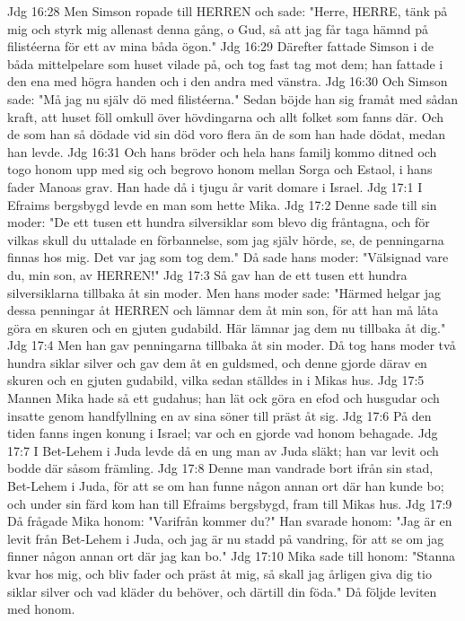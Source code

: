 Jdg 16:28  Men Simson ropade till HERREN och sade: "Herre, HERRE, tänk på mig och styrk mig allenast denna gång, o Gud, så att jag får taga hämnd på filistéerna för ett av mina båda ögon."
Jdg 16:29  Därefter fattade Simson i de båda mittelpelare som huset vilade på, och tog fast tag mot dem; han fattade i den ena med högra handen och i den andra med vänstra.
Jdg 16:30  Och Simson sade: "Må jag nu själv dö med filistéerna." Sedan böjde han sig framåt med sådan kraft, att huset föll omkull över hövdingarna och allt folket som fanns där. Och de som han så dödade vid sin död voro flera än de som han hade dödat, medan han levde.
Jdg 16:31  Och hans bröder och hela hans familj kommo ditned och togo honom upp med sig och begrovo honom mellan Sorga och Estaol, i hans fader Manoas grav. Han hade då i tjugu år varit domare i Israel.
Jdg 17:1  I Efraims bergsbygd levde en man som hette Mika.
Jdg 17:2  Denne sade till sin moder: "De ett tusen ett hundra silversiklar som blevo dig fråntagna, och för vilkas skull du uttalade en förbannelse, som jag själv hörde, se, de penningarna finnas hos mig. Det var jag som tog dem." Då sade hans moder: "Välsignad vare du, min son, av HERREN!"
Jdg 17:3  Så gav han de ett tusen ett hundra silversiklarna tillbaka åt sin moder. Men hans moder sade: "Härmed helgar jag dessa penningar åt HERREN och lämnar dem åt min son, för att han må låta göra en skuren och en gjuten gudabild. Här lämnar jag dem nu tillbaka åt dig."
Jdg 17:4  Men han gav penningarna tillbaka åt sin moder. Då tog hans moder två hundra siklar silver och gav dem åt en guldsmed, och denne gjorde därav en skuren och en gjuten gudabild, vilka sedan ställdes in i Mikas hus.
Jdg 17:5  Mannen Mika hade så ett gudahus; han lät ock göra en efod och husgudar och insatte genom handfyllning en av sina söner till präst åt sig.
Jdg 17:6  På den tiden fanns ingen konung i Israel; var och en gjorde vad honom behagade.
Jdg 17:7  I Bet-Lehem i Juda levde då en ung man av Juda släkt; han var levit och bodde där såsom främling.
Jdg 17:8  Denne man vandrade bort ifrån sin stad, Bet-Lehem i Juda, för att se om han funne någon annan ort där han kunde bo; och under sin färd kom han till Efraims bergsbygd, fram till Mikas hus.
Jdg 17:9  Då frågade Mika honom: "Varifrån kommer du?" Han svarade honom: "Jag är en levit från Bet-Lehem i Juda, och jag är nu stadd på vandring, för att se om jag finner någon annan ort där jag kan bo."
Jdg 17:10  Mika sade till honom: "Stanna kvar hos mig, och bliv fader och präst åt mig, så skall jag årligen giva dig tio siklar silver och vad kläder du behöver, och därtill din föda." Då följde leviten med honom.
